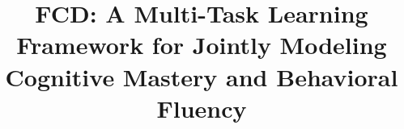 \documentclass[runningheads]{llncs}
\def\mymethod{FCD}
\begin{document}
\title{\mymethod: A Multi-Task Learning Framework for Jointly Modeling Cognitive Mastery and Behavioral Fluency}

\author{}
\institute{}




\maketitle              

\end{document}

